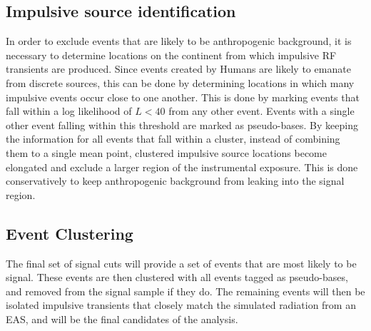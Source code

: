 	\subsection{Impulsive source identification}
		In order to exclude events that are likely to be anthropogenic background, it is necessary to determine locations on the continent from which impulsive RF transients are produced.  Since events created by Humans are likely to emanate from discrete sources, this can be done by determining locations in which many impulsive events occur close to one another.  This is done by marking events that fall within a log likelihood of $L<40$ from any other event.  Events with a single other event falling within this threshold are marked as pseudo-bases.  By keeping the information for all events that fall within a cluster, instead of combining them to a single mean point, clustered impulsive source locations become elongated and exclude a larger region of the instrumental exposure.  This is done conservatively to keep anthropogenic background from leaking into the signal region.
		
	\subsection{Event Clustering}
		The final set of signal cuts will provide a set of events that are most likely to be signal.  These events are then clustered with all events tagged as pseudo-bases, and removed from the signal sample if they do.  The remaining events will then be isolated impulsive transients that closely match the simulated radiation from an EAS, and will be the final candidates of the analysis.



	